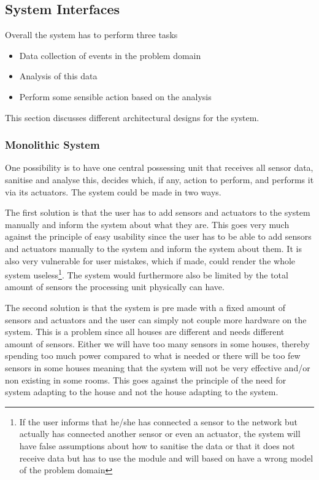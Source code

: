 \subsection{System Interfaces}

Overall the system has to perform three tasks
\begin{itemize}
\item Data collection of events in the problem domain
\item Analysis of this data
\item Perform some sensible action based on the analysis
\end{itemize}
This section discusses different architectural designs
for the system.

\subsubsection{Monolithic System} One possibility is to have one central possessing unit that receives all sensor data, sanitise and analyse this, decides which, if any, action to perform, and performs it via its actuators. The system could be made in two ways.

The first solution is that the user has to add sensors and actuators to the system manually and inform the system about what they are. This goes very much against the principle of easy usability since the user has to be able to add sensors and actuators manually to the system and inform the system about them. It is also very vulnerable for user mistakes, which if made, could render the whole system useless\footnote{If the user informs that he/she has connected a sensor to the network but actually has connected another sensor or even an actuator, the system will have false assumptions about how to sanitise the data or that it does not receive data but has to use the module and will based on have a wrong model of the problem domain}. The system would furthermore also be limited by the total amount of sensors the processing unit physically can have.

The second solution is that the system is pre made with a fixed amount of sensors and actuators and the user can simply not couple more hardware on the system. This is a problem since all houses are different and needs different amount of sensors. Either we will have too many sensors in some houses, thereby spending too much power compared to what is needed or there will be too few sensors in some houses meaning that the system will not be very effective and/or non existing in some rooms. This goes against the principle of the need for system adapting to the house and not the house adapting to the system.

